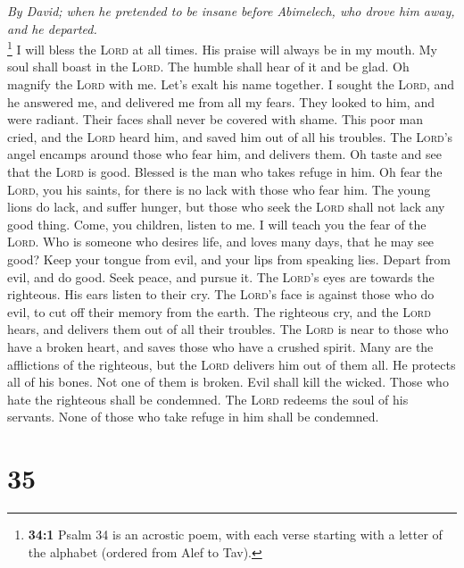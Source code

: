 \emph{By David; when he pretended to be insane before Abimelech, who
drove him away, and he departed.}\\
 \footnote{\textbf{34:1} Psalm 34 is an acrostic poem,
  with each verse starting with a letter of the alphabet (ordered from
  Alef to Tav).} I will bless the \textsc{Lord} at all times. His praise
will always be in my mouth.  My soul shall boast in the
\textsc{Lord}. The humble shall hear of it and be glad. 
Oh magnify the \textsc{Lord} with me. Let's exalt his name together.
 I sought the \textsc{Lord}, and he answered me, and
delivered me from all my fears.  They looked to him, and
were radiant. Their faces shall never be covered with shame.
 This poor man cried, and the \textsc{Lord} heard him, and
saved him out of all his troubles.  The \textsc{Lord}'s
angel encamps around those who fear him, and delivers them.
 Oh taste and see that the \textsc{Lord} is good. Blessed
is the man who takes refuge in him.  Oh fear the
\textsc{Lord}, you his saints, for there is no lack with those who fear
him.  The young lions do lack, and suffer hunger, but
those who seek the \textsc{Lord} shall not lack any good thing.
 Come, you children, listen to me. I will teach you the
fear of the \textsc{Lord}.  Who is someone who desires
life, and loves many days, that he may see good?  Keep
your tongue from evil, and your lips from speaking lies. 
Depart from evil, and do good. Seek peace, and pursue it.
 The \textsc{Lord}'s eyes are towards the righteous. His
ears listen to their cry.  The \textsc{Lord}'s face is
against those who do evil, to cut off their memory from the earth.
 The righteous cry, and the \textsc{Lord} hears, and
delivers them out of all their troubles.  The
\textsc{Lord} is near to those who have a broken heart, and saves those
who have a crushed spirit.  Many are the afflictions of
the righteous, but the \textsc{Lord} delivers him out of them all.
 He protects all of his bones. Not one of them is broken.
 Evil shall kill the wicked. Those who hate the righteous
shall be condemned.  The \textsc{Lord} redeems the soul
of his servants. None of those who take refuge in him shall be
condemned.

\hypertarget{section-34}{%
\section{35}\label{section-34}}


